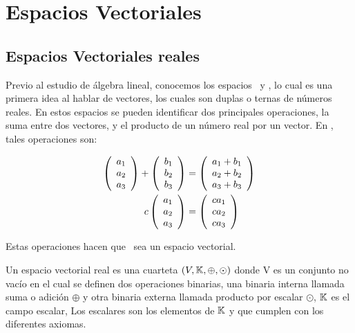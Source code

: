 
\chapter{Espacios Vectoriales}


\section{Espacios Vectoriales reales}
Previo al estudio de álgebra lineal, conocemos los espacios \rdos\ y \rtres, lo cual es una primera idea al hablar de vectores, los cuales son duplas o ternas de números reales. En estos espacios se pueden identificar dos principales operaciones, la suma entre dos vectores, y el producto de un número real por un vector. En \rtres, tales operaciones son:

\begin{align*}
\left( \begin{array}{r} a_1\\ a_2\\ a_3 \end{array} \right) +\left( \begin{array}{r} b_1\\ b_2\\ b_3 \end{array} \right) &=\left( \begin{array}{r} a_1+b_1\\ a_2+b_2\\ a_3+b_3 \end{array} \right) \\
c\left( \begin{array}{r} a_1\\ a_2\\ a_3 \end{array} \right) &=\left( \begin{array}{r} ca_1\\ ca_2\\ ca_3 \end{array} \right) 
\end{align*}

Estas operaciones hacen que \rtres\ sea un espacio vectorial. 

\begin{dfn}
Un espacio vectorial real es una cuarteta $(V, \mathbb{K}, \oplus, \odot)$ donde V es un conjunto no vacío en el cual se definen dos operaciones binarias, una binaria interna llamada suma o adición $\oplus$ y otra binaria externa llamada producto por escalar $\odot$, $\mathbb{K}$ es el campo escalar, Los escalares son los elementos de $\mathbb{K}$ y que cumplen con los diferentes axiomas. 
\end{dfn}

